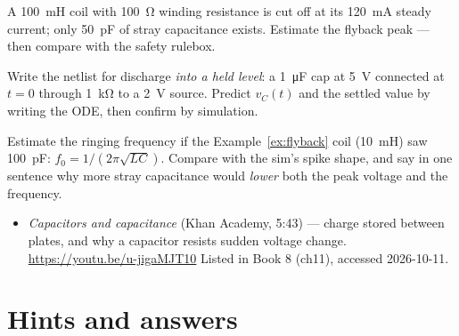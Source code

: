 \begin{exercise}[medium]
A \qty{100}{\milli\henry} coil with \qty{100}{\ohm} winding resistance is cut
off at its \qty{120}{\milli\ampere} steady current; only
\qty{50}{\pico\farad} of stray capacitance exists. Estimate the flyback peak
— then compare with the safety rulebox.
\end{exercise}

\begin{exercise}[hard]
Write the netlist for discharge \emph{into a held level}: a
\qty{1}{\micro\farad} cap at \qty{5}{\volt} connected at $t=0$ through
\qty{1}{\kilo\ohm} to a \qty{2}{\volt} source. Predict $v_C(t)$ and the
settled value by writing the ODE, then confirm by simulation.
\end{exercise}

\begin{exercise}[hard]
Estimate the ringing frequency if the Example~\ref{ex:flyback} coil
(\qty{10}{\milli\henry}) saw \qty{100}{\pico\farad}: $f_0=1/(2\pi\sqrt{LC})$.
Compare with the sim's spike shape, and say in one sentence why more stray
capacitance would \emph{lower} both the peak voltage and the frequency.
\end{exercise}

\begin{rulebox}
\begin{itemize}
\item \emph{Capacitors and capacitance} (Khan Academy, 5:43) --- charge stored between plates, and why a capacitor resists sudden voltage change. \url{https://youtu.be/u-jigaMJT10} Listed in Book 8 (ch11), accessed 2026-10-11.
\end{itemize}
\end{rulebox}

\section*{Hints and answers}

